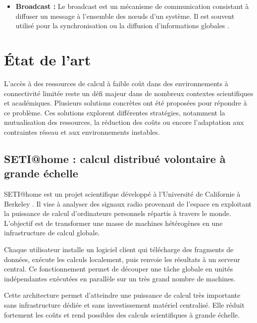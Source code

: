 \documentclass[12pt,a4paper]{report}
\theoremstyle{definition}
\begin{document}
\begin{itemize}
Au-delà de la simple signalisation de présence, le heartbeat constitue un élément essentiel de la supervision. Il permet au contrôleur de détecter rapidement les défaillances en cas d’absence de message dans un délai donné, d’évaluer la charge des machines et de maintenir la cohérence globale du cluster en facilitant les décisions d’orchestration et de réallocation des tâches.


    \item[$\bullet$] \textbf{Broadcast :} Le broadcast est un mécanisme de communication consistant à diffuser un message à l’ensemble des nœuds d’un système. Il est souvent utilisé pour la synchronisation ou la diffusion d’informations globales \cite{tanenbaum_ds}.
\end{itemize}
\section{État de l’art}

L’accès à des ressources de calcul à faible coût dans des environnements à connectivité limitée reste un défi majeur dans de nombreux contextes scientifiques et académiques. Plusieurs solutions concrètes ont été proposées pour répondre à ce problème. Ces solutions explorent différentes stratégies, notamment la mutualisation des ressources, la réduction des coûts ou encore l’adaptation aux contraintes réseau et aux environnements instables.

\subsection{SETI@home : calcul distribué volontaire à grande échelle}

SETI@home est un projet scientifique développé à l’Université de Californie à Berkeley \cite{seti}. Il vise à analyser des signaux radio provenant de l’espace en exploitant la puissance de calcul d’ordinateurs personnels répartis à travers le monde. L’objectif est de transformer une masse de machines hétérogènes en une infrastructure de calcul globale.

Chaque utilisateur installe un logiciel client qui télécharge des fragments de données, exécute les calculs localement, puis renvoie les résultats à un serveur central. Ce fonctionnement permet de découper une tâche globale en unités indépendantes exécutées en parallèle sur un très grand nombre de machines.

Cette architecture permet d’atteindre une puissance de calcul très importante sans infrastructure dédiée et sans investissement matériel centralisé. Elle réduit fortement les coûts et rend possibles des calculs scientifiques à grande échelle.
\end{document}
